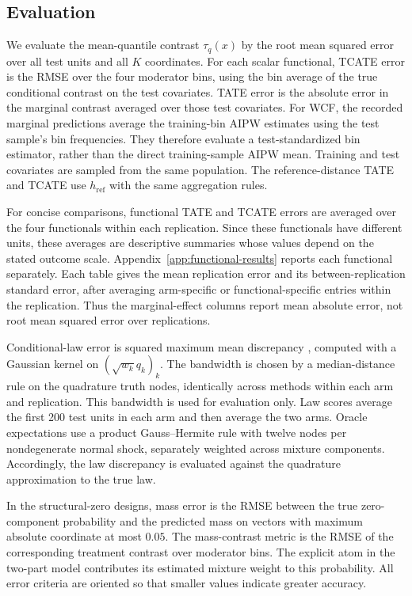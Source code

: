 \subsection{Evaluation}\label{sec:metrics}

We evaluate the mean-quantile contrast $\tau_q(x)$ by the root mean squared error over all test units and all $K$ coordinates. For each scalar functional, TCATE error is the RMSE over the four moderator bins, using the bin average of the true conditional contrast on the test covariates. TATE error is the absolute error in the marginal contrast averaged over those test covariates. For WCF, the recorded marginal predictions average the training-bin AIPW estimates using the test sample's bin frequencies. They therefore evaluate a test-standardized bin estimator, rather than the direct training-sample AIPW mean. Training and test covariates are sampled from the same population. The reference-distance TATE and TCATE use $h_{\mathrm{ref}}$ with the same aggregation rules.

For concise comparisons, functional TATE and TCATE errors are averaged over the four functionals within each replication. Since these functionals have different units, these averages are descriptive summaries whose values depend on the stated outcome scale. Appendix~\ref{app:functional-results} reports each functional separately. Each table gives the mean replication error and its between-replication standard error, after averaging arm-specific or functional-specific entries within the replication. Thus the marginal-effect columns report mean absolute error, not root mean squared error over replications.

Conditional-law error is squared maximum mean discrepancy \citep{gretton2012kernel}, computed with a Gaussian kernel on $(\sqrt{w_k}q_k)_k$. The bandwidth is chosen by a median-distance rule on the quadrature truth nodes, identically across methods within each arm and replication. This bandwidth is used for evaluation only. Law scores average the first 200 test units in each arm and then average the two arms. Oracle expectations use a product Gauss--Hermite rule with twelve nodes per nondegenerate normal shock, separately weighted across mixture components. Accordingly, the law discrepancy is evaluated against the quadrature approximation to the true law.

In the structural-zero designs, mass error is the RMSE between the true zero-component probability and the predicted mass on vectors with maximum absolute coordinate at most $0.05$. The mass-contrast metric is the RMSE of the corresponding treatment contrast over moderator bins. The explicit atom in the two-part model contributes its estimated mixture weight to this probability. All error criteria are oriented so that smaller values indicate greater accuracy.

